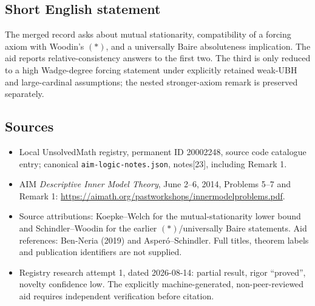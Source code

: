 \documentclass[11pt]{article}
\begin{document}
\subsection{Short English statement}
The merged record asks about mutual stationarity, compatibility of a forcing axiom with Woodin's $(*)$, and a universally Baire absoluteness implication. The aid reports relative-consistency answers to the first two. The third is only reduced to a high Wadge-degree forcing statement under explicitly retained weak-UBH and large-cardinal assumptions; the nested stronger-axiom remark is preserved separately.
\subsection{Sources}
\begin{itemize}
\item Local UnsolvedMath registry, permanent ID 20002248, source code catalogue entry; canonical \texttt{aim-logic-notes.json}, notes[23], including Remark 1.
\item AIM \emph{Descriptive Inner Model Theory}, June 2--6, 2014, Problems 5--7 and Remark 1: \url{https://aimath.org/pastworkshops/innermodelproblems.pdf}.
\item Source attributions: Koepke--Welch for the mutual-stationarity lower bound and Schindler--Woodin for the earlier $(*)$/universally Baire statements. Aid references: Ben-Neria (2019) and Asper\'o--Schindler. Full titles, theorem labels and publication identifiers are not supplied.
\item Registry research attempt 1, dated 2026-08-14: partial result, rigor ``proved'', novelty confidence low. The explicitly machine-generated, non-peer-reviewed aid requires independent verification before citation.
\end{itemize}
\end{document}

